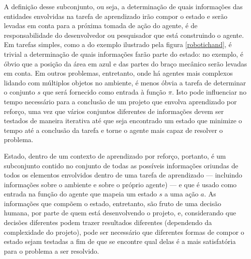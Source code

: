 \documentclass[cic,tc]{iiufrgs}
\newcommand\bruno[1]{\textcolor{magenta}{#1}}
\begin{document}

A definição desse subconjunto, ou seja, a determinação de quais informações das entidades envolvidas na tarefa de aprendizado irão compor o estado e serão
levadas em conta para a próxima tomada de ação do agente, é de responsabilidade do desenvolvedor ou pesquisador que está construindo
o agente. Em tarefas simples, como a do exemplo ilustrado pela figura \ref{robotichand}, é trivial a determinação de quais informações farão
parte do estado: no exemplo, é óbvio que a posição da área em azul e das partes do braço mecânico serão levadas em conta. Em outros
problemas, entretanto, onde há agentes mais complexos lidando com múltiplos objetos no ambiente, é menos óbvia a tarefa de determinar
o conjunto $s$ que será fornecido como entrada à função $\pi$. Isto pode influenciar no tempo necessário para a conclusão de um projeto
que envolva aprendizado por reforço, uma vez que vários conjuntos diferentes de informações devem ser testados de maneira iterativa
até que seja encontrado um estado que minimize o tempo até a conclusão da tarefa e torne o agente mais capaz de resolver o problema.


Estado, dentro de um contexto de aprendizado por reforço, portanto, é um subconjunto contido no conjunto de todas as possíveis informações oriundas
de todos os elementos envolvidos dentro de uma tarefa de aprendizado  --- incluindo informações sobre o ambiente e sobre o próprio agente) --- e que é usado
como entrada na função do agente que mapeia um estado $s$ a uma
ação $a$. As informações que compõem o estado, entretanto, são fruto de uma decisão humana, por parte de quem está desenvolvendo o projeto, e,
considerando que decisões diferentes podem trazer resultados diferentes (dependendo da complexidade do projeto), pode ser necessário
que diferentes formas de compor o estado sejam testadas a fim de que se encontre qual delas é a mais satisfatória para o problema a ser resolvido.
\end{document}

